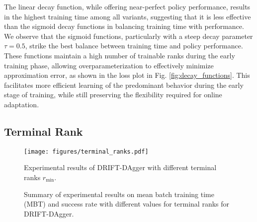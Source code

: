 The linear decay function, while offering near-perfect policy performance, results in the highest training time among all variants, suggesting that it is less effective than the sigmoid decay functions in balancing training time with performance. We observe that the sigmoid functions, particularly with a steep decay parameter $\tau = 0.5$, strike the best balance between training time and policy performance. These functions maintain a high number of trainable ranks during the early training phase, allowing overparameterization to effectively minimize approximation error, as shown in the loss plot in Fig. \ref{fig:decay_functions}. This facilitates more efficient learning of the predominant behavior during the early stage of training, while still preserving the flexibility required for online adaptation.

\subsection{Terminal Rank}
\label{sec:abl_tr}



\begin{figure}[tbp]
\centering
\begin{minipage}{\columnwidth}
\texttt{[image: figures/terminal\_ranks.pdf]}
\caption{Experimental results of DRIFT-DAgger with different terminal ranks $r_{\text{min}}$.}
\label{fig:terminal_ranks}
\end{minipage}

\vspace{1em} 

\begin{minipage}{\columnwidth}
    \centering
    \renewcommand\arraystretch{1.2}
    \caption{Summary of experimental results on mean batch training time (MBT) and success rate with different values for terminal ranks for DRIFT-DAgger. \label{tab:terminal_ranks}}
\end{minipage}
\end{figure}

